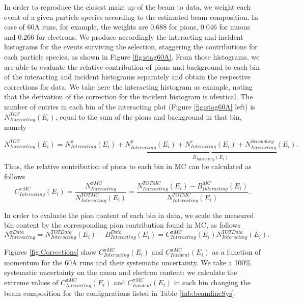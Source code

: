 In order to reproduce the closest make up of the beam to data, we weight each event of a given particle species according to the estimated beam composition. In case of 60A runs, for example, the weights are 0.688 for pions,  0.046 for muons  and 0.266 for electrons.
We produce accordingly the interacting and incident histograms for the events surviving the selection, staggering the contributions for each particle species, as shown in Figure  \ref{fig:stag60A}. From those histograms, we are able to evaluate the relative contribution of  pions and  background to each bin of the interacting and incident histograms separately and obtain the respective corrections for data. We take here the interacting histogram as example, noting that the derivation of the correction for the incident histogram is identical. The number of entries in each bin of the interacting plot (Figure \ref{fig:stag60A} left) is  $N^{TOT}_{Interacting} (E_{i})$, equal to the sum of the pions and background in that bin, namely

\begin{equation}
N^{TOT}_{Interacting} (E_{i}) =  N^\pi_{Interacting} (E_{i}) + \underbrace{ N^\mu_{Interacting} (E_{i}) + N^e_{Interacting} (E_{i}) + N^{Secondary}_{Interacting} (E_{i}) }_{B_{Interacting} (E_i)}.
\end{equation}
Thus, the relative contribution of pions to each bin in MC can be calculated as follows
\begin{equation}
C^{\pi MC}_{Interacting} (E_{i}) =  \frac{N^{\pi MC}_{Interacting}}{ N^{TOT MC}_{Interacting} (E_{i}) } =    \frac{N^{TOT MC}_{Interacting} (E_{i}) - B^ {MC}_{Interacting} (E_i)}{ N^{TOT MC}_{Interacting} (E_{i})}.
\end{equation}


In order to evaluate the pion content of each bin in data, we scale the measured bin content by the corresponding  pion contribution found in MC, as follows
\begin{equation}
N^{\pi Data}_{Interacting} = N^{TOT Data}_{Interacting} (E_{i}) - B^{Data}_{Interacting} (E_i)  =  C^{\pi MC}_{Interacting} (E_{i}) N^{TOT Data}_{Interacting} (E_{i}).
\end{equation}

Figures \ref{fig:Corrections} show $C^{\pi MC}_{Interacting} (E_{i})$ and $C^{\pi MC}_{Incident} (E_{i})$ as a function of momentum for the 60A runs and their systematic uncertainty. 
We take a 100\% systematic uncertainty on the muon and electron content: we calculate the extreme values of  $C^{\pi MC}_{Interacting} (E_{i})$ and $C^{\pi MC}_{Incident} (E_{i})$ in each bin changing the beam composition for the configurations listed in Table \ref{tab:beamlineSys}.



